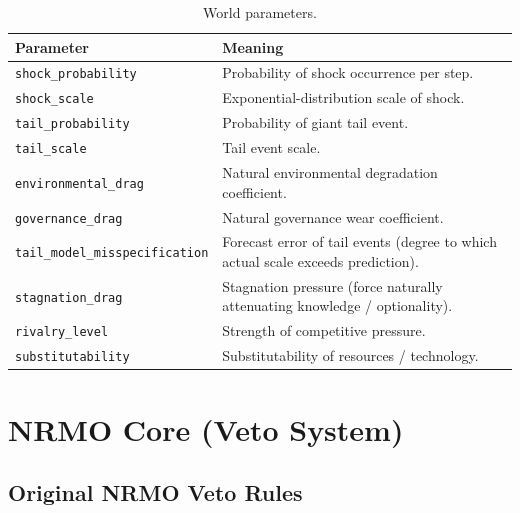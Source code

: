 \begin{table}[ht]
\centering
\small
\begin{tabularx}{\linewidth}{lX}
\toprule
\textbf{Parameter} & \textbf{Meaning} \\
\midrule
\texttt{shock\_probability} & Probability of shock occurrence per
step. \\
\texttt{shock\_scale} & Exponential-distribution scale of shock. \\
\texttt{tail\_probability} & Probability of giant tail event. \\
\texttt{tail\_scale} & Tail event scale. \\
\texttt{environmental\_drag} & Natural environmental degradation
coefficient. \\
\texttt{governance\_drag} & Natural governance wear coefficient. \\
\texttt{tail\_model\_misspecification} & Forecast error of tail
events (degree to which actual scale exceeds prediction). \\
\texttt{stagnation\_drag} & Stagnation pressure (force naturally
attenuating knowledge / optionality). \\
\texttt{rivalry\_level} & Strength of competitive pressure. \\
\texttt{substitutability} & Substitutability of resources /
technology. \\
\bottomrule
\end{tabularx}
\caption[World parameters]{World parameters.}
\label{tab:vnext-world-params}
\end{table}

\section{NRMO Core (Veto System)}
\label{sec:vnext-nrmo-core}


\clearpage
\subsection{Original NRMO Veto Rules}
\label{sec:vnext-original-veto}

